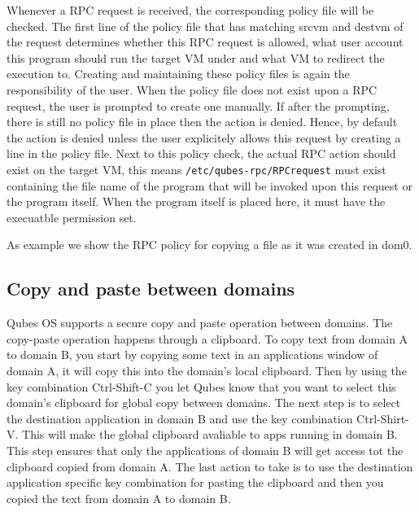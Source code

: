 \documentclass[runningheads,a4paper]{article}
\begin{document}
Whenever a RPC request is received, the corresponding policy file will
be checked. The first line of the policy file that has matching srcvm
and destvm of the request determines whether this RPC request is
allowed, what user account this program should run the target VM under
and what VM to redirect the execution to. Creating and maintaining
these policy files is again the responsibility of the user. When the
policy file does not exist upon a RPC request, the user is prompted to
create one manually. If after the prompting, there is still no policy
file in place then the action is denied. Hence, by default the action
is denied unless the user explicitely allows this request by creating
a line in the policy file. Next to this policy check,
the actual RPC action should exist on the target VM, this means
\texttt{/etc/qubes-rpc/RPCrequest} must exist containing the file name
of the program that will be invoked upon this request or the
program itself. When the program itself is placed here, it must have
the execuatble permission set. 

As example we show the RPC policy for copying a file as it was created
in dom0.

\subsection{Copy and paste between domains} 

Qubes OS supports a secure
copy and paste operation between domains.  The copy-paste operation
happens through a clipboard.  To copy text from domain A to domain B,
you start by copying some text in an applications window of domain A,
it will copy this into the domain's local clipboard.  Then by using
the key combination Ctrl-Shift-C you let Qubes know that you want to
select this domain's clipboard for global copy between domains.  The
next step is to select the destination application in domain B and use
the key combination Ctrl-Shirt-V.  This will make the global clipboard
avaliable to apps running in domain B.  This step ensures that only
the applications of domain B will get access tot the clipboard copied
from domain A.  The last action to take is to use the destination
application specific key combination for pasting the clipboard and
then you copied the text from domain A to domain B.
\end{document}
